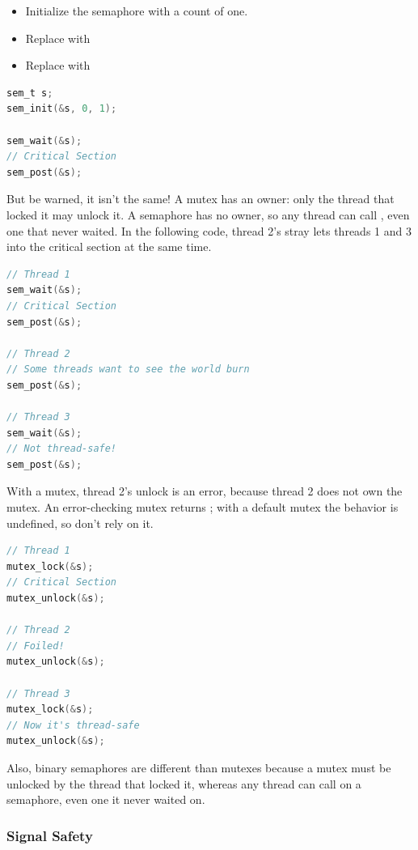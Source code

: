 \begin{itemize}
\item Initialize the semaphore with a count of one.
\item Replace  with 
\item Replace  with 
\end{itemize}

\begin{lstlisting}[language=C]
sem_t s;
sem_init(&s, 0, 1);

sem_wait(&s);
// Critical Section
sem_post(&s);
\end{lstlisting}

But be warned, it isn't the same!
A mutex has an owner: only the thread that locked it may unlock it.
A semaphore has no owner, so any thread can call , even one that never waited.
In the following code, thread 2's stray  lets threads 1 and 3 into the critical section at the same time.

\begin{lstlisting}[language=C]
// Thread 1
sem_wait(&s);
// Critical Section
sem_post(&s);

// Thread 2
// Some threads want to see the world burn
sem_post(&s);

// Thread 3
sem_wait(&s);
// Not thread-safe!
sem_post(&s);
\end{lstlisting}

With a mutex, thread 2's unlock is an error, because thread 2 does not own the mutex.
An error-checking mutex returns ; with a default mutex the behavior is undefined, so don't rely on it.

\begin{lstlisting}[language=C]
// Thread 1
mutex_lock(&s);
// Critical Section
mutex_unlock(&s);

// Thread 2
// Foiled!
mutex_unlock(&s);

// Thread 3
mutex_lock(&s);
// Now it's thread-safe
mutex_unlock(&s);
\end{lstlisting}

Also, binary semaphores are different than mutexes because a mutex must be unlocked by the thread that locked it, whereas any thread can call  on a semaphore, even one it never waited on.

\subsubsection{Signal Safety}

